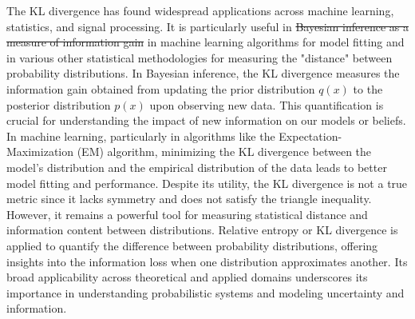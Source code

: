 \documentclass[12pt]{article}
\begin{document}
		The KL divergence has found widespread applications across machine learning, statistics, and signal processing. It is particularly useful in \st{Bayesian inference as a measure of information gain} in machine learning algorithms for model fitting and in various other statistical methodologies for measuring the "distance" between probability distributions. In Bayesian inference, the KL divergence measures the information gain obtained from updating the prior distribution \(q(x)\) to the posterior distribution \(p(x)\) upon observing new data. This quantification is crucial for understanding the impact of new information on our models or beliefs. In machine learning, particularly in algorithms like the Expectation-Maximization (EM) algorithm, minimizing the KL divergence between the model's distribution and the empirical distribution of the data leads to better model fitting and performance. Despite its utility, the KL divergence is not a true metric since it lacks symmetry and does not satisfy the triangle inequality. However, it remains a powerful tool for measuring statistical distance and information content between distributions. Relative entropy or KL divergence is applied to quantify the difference between probability distributions, offering insights into the information loss when one distribution approximates another. Its broad applicability across theoretical and applied domains underscores its importance in understanding probabilistic systems and modeling uncertainty and information.
		
		
		
		
\end{document}
